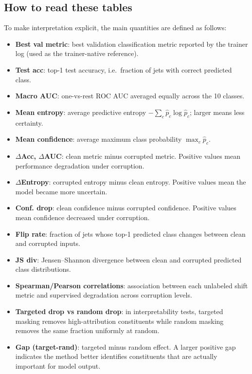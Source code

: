 \documentclass[10pt]{article}
\begin{document}
\subsection*{How to read these tables}
To make interpretation explicit, the main quantities are defined as follows:
\begin{itemize}[leftmargin=*]
\item \textbf{Best val metric}: best validation classification metric reported by the trainer log (used as the trainer-native reference).
\item \textbf{Test acc}: top-1 test accuracy, i.e.\ fraction of jets with correct predicted class.
\item \textbf{Macro AUC}: one-vs-rest ROC AUC averaged equally across the 10 classes.
\item \textbf{Mean entropy}: average predictive entropy $-\sum_c \hat p_c\log \hat p_c$; larger means less certainty.
\item \textbf{Mean confidence}: average maximum class probability $\max_c \hat p_c$.
\item \textbf{$\Delta$Acc, $\Delta$AUC}: clean metric minus corrupted metric. Positive values mean performance degradation under corruption.
\item \textbf{$\Delta$Entropy}: corrupted entropy minus clean entropy. Positive values mean the model became more uncertain.
\item \textbf{Conf. drop}: clean confidence minus corrupted confidence. Positive values mean confidence decreased under corruption.
\item \textbf{Flip rate}: fraction of jets whose top-1 predicted class changes between clean and corrupted inputs.
\item \textbf{JS div}: Jensen--Shannon divergence between clean and corrupted predicted class distributions.
\item \textbf{Spearman/Pearson correlations}: association between each unlabeled shift metric and supervised degradation across corruption levels.
\item \textbf{Targeted drop vs random drop}: in interpretability tests, targeted masking removes high-attribution constituents while random masking removes the same fraction uniformly at random.
\item \textbf{Gap (target-rand)}: targeted minus random effect. A larger positive gap indicates the method better identifies constituents that are actually important for model output.
\end{itemize}
\end{document}
